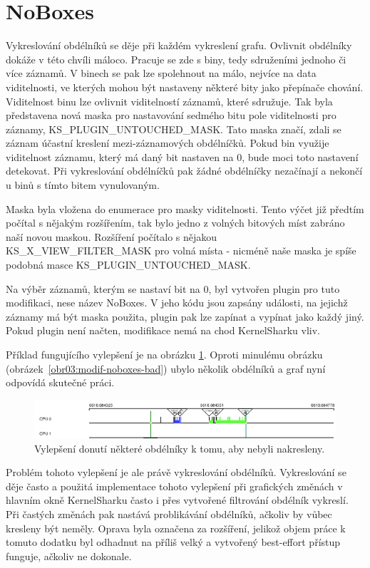 \section{NoBoxes}

Vykreslování obdélníků se děje při každém vykreslení grafu. Ovlivnit obdélníky dokáže v této chvíli máloco. Pracuje se zde s biny, tedy sdruženími jednoho či více záznamů. V binech se pak lze spolehnout na málo, nejvíce na data viditelnosti, ve kterých mohou být nastaveny některé bity jako přepínače chování. Viditelnost binu lze ovlivnit viditelností záznamů, které sdružuje. Tak byla představena nová maska pro nastavování sedmého bitu pole viditelnosti pro záznamy, KS\_PLUGIN\_UNTOUCHED\_MASK. Tato maska značí, zdali se záznam účastní kreslení mezi-záznamových obdélníčků. Pokud bin využije viditelnost záznamu, který má daný bit nastaven na 0, bude moci toto nastavení detekovat. Při vykreslování obdélníčků pak žádné obdélníčky nezačínají a nekončí u binů s tímto bitem vynulovaným.

Maska byla vložena do enumerace pro masky viditelnosti. Tento výčet již předtím počítal s nějakým rozšířením, tak bylo jedno z volných bitových míst zabráno naší novou maskou. Rozšíření počítalo s nějakou KS\_X\_VIEW\_FILTER\_MASK pro volná místa - nicméně naše maska je spíše podobná masce KS\_PLUGIN\_UNTOUCHED\_MASK.

Na výběr záznamů, kterým se nastaví bit na 0, byl vytvořen plugin pro tuto modifikaci, nese název NoBoxes. V jeho kódu jsou zapsány události, na jejichž záznamy má být maska použita, plugin pak lze zapínat a vypínat jako každý jiný. Pokud plugin není načten, modifikace nemá na chod KernelSharku vliv.

Příklad fungujícího vylepšení je na obrázku \ref{obr04:modif-noboxes-good}. Oproti minulému obrázku (obrázek~\ref{obr03:modif-noboxes-bad}) ubylo několik obdélníků a graf nyní odpovídá skutečné práci.

\begin{figure}[p]\centering
    \includegraphics[width=140mm]{img/modif-noboxes-good}
    \caption{Vylepšení donutí některé obdélníky k tomu, aby nebyli nakresleny.}
    \label{obr04:modif-noboxes-good}
\end{figure}

Problém tohoto vylepšení je ale právě vykreslování obdélníků. Vykreslování se děje často a použitá implementace tohoto vylepšení při grafických změnách v hlavním okně KernelSharku často i přes vytvořené filtrování obdélník vykreslí. Při častých změnách pak nastává problikávání obdélníků, ačkoliv by vůbec kresleny být neměly. Oprava byla označena za rozšíření, jelikož objem práce k tomuto dodatku byl odhadnut na příliš velký a vytvořený best-effort přístup funguje, ačkoliv ne dokonale.